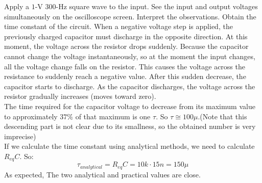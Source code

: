 \documentclass[11pt]{article}
\begin{document}
\begin{question}
\begin{subquestion}{Apply a $1$-V $300$-Hz square wave to the input. See the input and output voltages simultaneously on the oscilloscope screen. Interpret the observations. Obtain the time constant of the circuit.}
{            When a negative voltage step is applied, the previously charged capacitor must discharge in the opposite direction. At this moment, the voltage across the resistor drops suddenly. Because the capacitor cannot change the voltage instantaneously, so at the moment the input changes, all the voltage change falls on the resistor. This causes the voltage across the resistance to suddenly reach a negative value. After this sudden decrease, the capacitor starts to discharge. As the capacitor discharges, the voltage across the resistor gradually increases (moves toward zero). \\

            The time required for the capacitor voltage to decrease from its maximum value to approximately $37\%$ of that maximum is one $\tau$.
            So $\tau \cong 100\mu$.(Note that this descending part is not clear due to its smallness, so the obtained number is very imprecise) \\
            If we calculate the time constant using analytical methods, we need to calculate $R_{eq}C$. So:
            \[
                \tau_{analytical} = R_{eq}C = 10k \cdot 15n = 150\mu
            \]
            As expected, The two analytical and practical values are close.
        }
    \end{subquestion}


\end{question}
\end{document}
